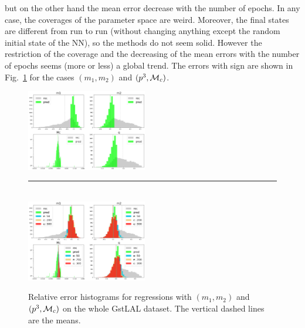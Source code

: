 \documentclass[prd,aps,twocolumn,a4paper,showkeys,nofootinbib]{revtex4-1}
\def\Mc{{\cal M}_c}
\begin{document}
but on the other hand the mean error decrease with the number of epochs. 
In any case, the coverages of the parameter space are weird. 
Moreover, the final states are different from run to run (without changing anything
except the random initial state of the NN), so the methods do
not seem solid. However the restriction of the coverage and the decreasing 
of the mean errors with the number of epochs seems (more or less) a global trend.  
The errors with sign are shown in Fig.~\ref{fig:errhisto} for the cases
$(m_1,m_2)$ and $(p^3, \Mc)$.
%
\begin{figure}[]
  \center
  \includegraphics[width=0.47\textwidth]{./Figs/errhisto_m1m2.png}
  \rule[1ex]{8cm}{0.5pt}\\
  \includegraphics[width=0.47\textwidth]{./Figs/errhisto_p3Mc.png}
  \caption{\label{fig:errhisto} Relative error histograms for regressions with $(m_1,m_2)$ and 
  $(p^3, \Mc)$ on the whole GstLAL dataset. The vertical dashed lines are the means.}
\end{figure}
%
\end{document}
